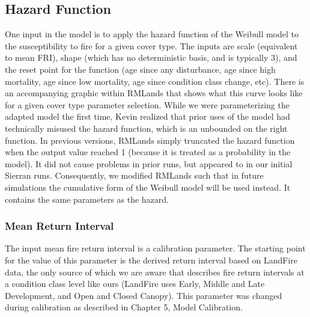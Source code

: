 \subsection{Hazard Function}
One input in the model is to apply the hazard function of the Weibull model to the susceptibility to fire for a given cover type. The inputs are scale (equivalent to mean FRI), shape (which has no deterministic basis, and is typically 3), and the reset point for the function (age since any disturbance, age since high mortality, age since low mortality, age since condition class change, etc). There is an accompanying graphic within RMLands that shows what this curve looks like for a given cover type parameter selection. While we were parameterizing the adapted model the first time, Kevin realized that prior uses of the model had technically misused the hazard function, which is an unbounded on the right function. In previous versions, RMLands simply truncated the hazard function when the output value reached 1 (because it is treated as a probability in the model). It did not cause problems in prior runs, but appeared to in our initial Sierran runs. Consequently, we modified RMLands such that in future simulations the cumulative form of the Weibull model will be used instead. It contains the same parameters as the hazard.

\subsubsection{Mean Return Interval}
The input mean fire return interval is a calibration parameter. The starting point for the value of this parameter is the derived return interval based on LandFire data, the only source of which we are aware that describes fire return intervals at a condition class level like ours (LandFire uses Early, Middle and Late Development, and Open and Closed Canopy). This parameter was changed during calibration as described in Chapter 5, Model Calibration.

